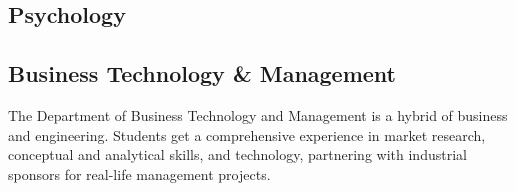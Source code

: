 
\subsection{Psychology}
\label{sec:research:psy}

\subsection{Business Technology \& Management}
The Department of Business Technology and Management is a hybrid of business and engineering. Students get a comprehensive experience in market research, conceptual and analytical skills, and technology, partnering with industrial sponsors for real-life management projects. 
